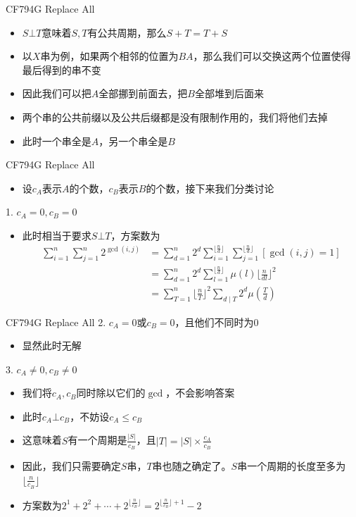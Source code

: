 \documentclass{beamer}
\begin{document}
\begin{frame}{CF794G Replace All}
    \begin{itemize}
        \item $S\bot T$意味着$S, T$有公共周期，那么$S + T = T + S$
        \item 以$X$串为例，如果两个相邻的位置为$BA$，那么我们可以交换这两个位置使得最后得到的串不变
        \item 因此我们可以把$A$全部挪到前面去，把$B$全部堆到后面来
        \item 两个串的公共前缀以及公共后缀都是没有限制作用的，我们将他们去掉
        \item 此时一个串全是$A$，另一个串全是$B$
    \end{itemize}
\end{frame}

\begin{frame}{CF794G Replace All}
    \begin{itemize}
        \item 设$c_A$表示$A$的个数，$c_B$表示$B$的个数，接下来我们分类讨论
    \end{itemize}
    1. $c_A = 0, c_B = 0$
    \begin{itemize}
        \item 此时相当于要求$S \bot T$，方案数为
        $$\begin{aligned}
            \sum_{i = 1}^n \sum_{j = 1}^n 2^{\gcd(i, j)} &= \sum_{d = 1}^n 2^d \sum_{i = 1}^{\lfloor\frac nd\rfloor}\sum_{j = 1}^{\lfloor\frac nd\rfloor}[\gcd(i, j) = 1]\\
            &= \sum_{d = 1}^n 2^d \sum_{l = 1}^{\lfloor\frac nd\rfloor}\mu(l)\lfloor\frac n{dl}\rfloor^2\\
            &= \sum_{T = 1}^n \lfloor\frac nT\rfloor^2 \sum_{d\mid T} 2^d\mu(\frac Td)
        \end{aligned}$$
    \end{itemize}
\end{frame}

\begin{frame}{CF794G Replace All}
    2. $c_A = 0$或$c_B = 0$，且他们不同时为$0$
    \begin{itemize}
        \item 显然此时无解
    \end{itemize}
    3. $c_A\neq 0, c_B\neq 0$
    \begin{itemize}
        \item 我们将$c_A, c_B$同时除以它们的$\gcd$，不会影响答案
        \item 此时$c_A\bot c_B$，不妨设$c_A\leq c_B$
        \item 这意味着$S$有一个周期是$\frac{|S|}{c_B}$，且$|T| = |S|\times \frac{c_A}{c_B}$
        \item 因此，我们只需要确定$S$串，$T$串也随之确定了。$S$串一个周期的长度至多为$\lfloor\frac{n}{c_B}\rfloor$
        \item 方案数为$2^1 + 2^2 + \cdots + 2^{\lfloor\frac n{c_B}\rfloor} = 2^{\lfloor\frac n{c_B}\rfloor + 1} - 2$
    \end{itemize}
\end{frame}
\end{document}
